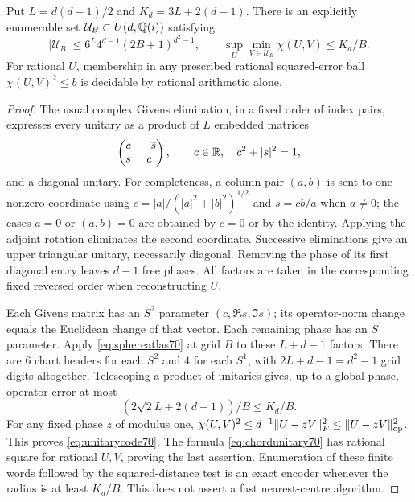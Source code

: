 \begin{lemma}\label{lem:unitaryatlas70}
Put $L=d(d-1)/2$ and $K_d=3L+2(d-1)$. There is an explicitly enumerable
set $\mathcal U_B\subset U(d,\mathbb Q(i))$ satisfying
\begin{equation}\label{eq:unitarycode70}
 |\mathcal U_B|\le6^L4^{d-1}(2B+1)^{d^2-1},\qquad
 \sup_U\min_{V\in\mathcal U_B}\chi(U,V)\le K_d/B.
\end{equation}
For rational $U$, membership in any prescribed rational squared-error
ball $\chi(U,V)^2\le b$ is decidable by rational arithmetic alone.
\end{lemma}
\begin{proof}
The usual complex Givens elimination, in a fixed order of index pairs,
expresses every unitary as a product of $L$ embedded matrices
\[
 \begin{pmatrix}c&-\overline s\\s&c\end{pmatrix},
       \qquad c\in\mathbb R,\quad c^2+|s|^2=1,
\]
and a diagonal unitary. For completeness, a column pair $(a,b)$ is sent
to one nonzero coordinate using $c=|a|/(|a|^2+|b|^2)^{1/2}$ and
$s=cb/a$ when $a\ne0$; the cases $a=0$ or $(a,b)=0$ are obtained by
$c=0$ or by the identity. Applying the adjoint rotation eliminates the
second coordinate. Successive eliminations give an upper triangular
unitary, necessarily diagonal. Removing the phase of its first diagonal
entry leaves $d-1$ free phases. All factors are taken in the corresponding
fixed reversed order when reconstructing $U$.

Each Givens matrix has an $S^2$ parameter $(c,\Re s,\Im s)$; its
operator-norm change equals the Euclidean change of that vector. Each
remaining phase has an $S^1$ parameter. Apply
\eqref{eq:sphereatlas70} at grid $B$ to these $L+d-1$ factors.
There are $6$ chart headers for each $S^2$ and $4$ for each $S^1$,
with $2L+d-1=d^2-1$ grid digits altogether. Telescoping a product of
unitaries gives, up to a global phase, operator error at most
\[
 (2\sqrt2 L+2(d-1))/B\le K_d/B.
\]
For any fixed phase $z$ of modulus one,
$\chi(U,V)^2\le d^{-1}\|U-zV\|_F^2\le\|U-zV\|_{\rm op}^2$.
This proves \eqref{eq:unitarycode70}. The formula
\eqref{eq:chordunitary70} has rational square for rational $U,V$, proving
the last assertion. Enumeration of these finite words followed by the
squared-distance test is an exact encoder whenever the radius is at least
$K_d/B$. This does not assert a fast nearest-centre algorithm.
\end{proof}

